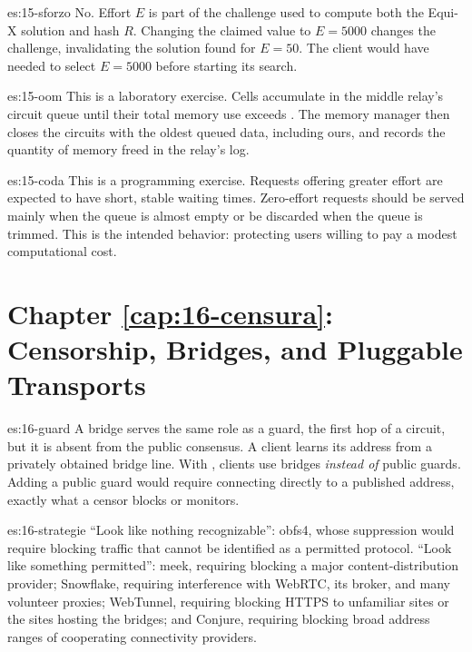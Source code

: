 \begin{soluzione}{es:15-sforzo}
No. Effort $E$ is part of the challenge used to compute both the Equi-X solution and hash $R$. Changing the claimed value to $E = 5000$ changes the challenge, invalidating the solution found for $E = 50$. The client would have needed to select $E = 5000$ before starting its search.
\end{soluzione}

\begin{soluzione}{es:15-oom}
This is a laboratory exercise. Cells accumulate in the middle relay's circuit queue until their total memory use exceeds . The memory manager then closes the circuits with the oldest queued data, including ours, and records the quantity of memory freed in the relay's log.
\end{soluzione}

\begin{soluzione}{es:15-coda}
This is a programming exercise. Requests offering greater effort are expected to have short, stable waiting times. Zero-effort requests should be served mainly when the queue is almost empty or be discarded when the queue is trimmed. This is the intended behavior: protecting users willing to pay a modest computational cost.
\end{soluzione}

\section*{Chapter \ref{cap:16-censura}: Censorship, Bridges, and Pluggable Transports}

\begin{soluzione}{es:16-guard}
A bridge serves the same role as a guard, the first hop of a circuit, but it is absent from the public consensus. A client learns its address from a privately obtained bridge line. With , clients use bridges \emph{instead of} public guards. Adding a public guard would require connecting directly to a published address, exactly what a censor blocks or monitors.
\end{soluzione}

\begin{soluzione}{es:16-strategie}
\enquote{Look like nothing recognizable}: obfs4, whose suppression would require blocking traffic that cannot be identified as a permitted protocol. \enquote{Look like something permitted}: meek, requiring blocking a major content-distribution provider; Snowflake, requiring interference with WebRTC, its broker, and many volunteer proxies; WebTunnel, requiring blocking HTTPS to unfamiliar sites or the sites hosting the bridges; and Conjure, requiring blocking broad address ranges of cooperating connectivity providers.
\end{soluzione}

